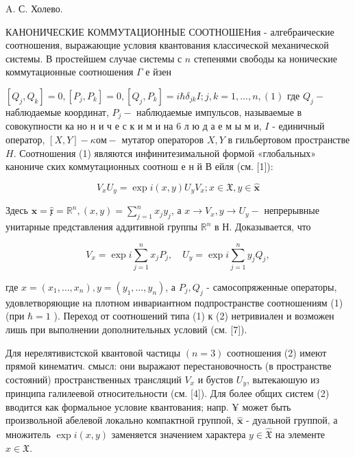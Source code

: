 \documentclass[10pt]{article}
\begin{document}
A. С. Холево.



КАНОНИЧЕСКИЕ КОММУТАЦИОННЫЕ СООТНОШЕНия - алгебраические соотношения, выражающие условия квантования классической механической системы. В простейшем случае системы с $n$ степенями свободы ка нонические коммутационные соотношения $\Gamma$ е йзен



$\left[Q_{j}, Q_{k}\right]=0,\left[P_{j}, P_{k}\right]=0,\left[Q_{j}, P_{k}\right]=i \hbar \delta_{j k} I ; j, k=1, \ldots, n,(1)$ где $Q_{j}-$ наблюдаемые координат, $P_{j}-$ наблюдаемые импульсов, называемые в совокупности ка но н и ч е с к и м и на 6 л ю д а е м ы м и, $I$ - единичный оператор, $[X, Y]-\kappa о м-$ мутатор операторов $X, Y$ в гильбертовом пространстве $H$. Соотношения (1) являются инфинитезимальной формой «глобальных» канониче ских коммутационных соотнош е н й В ейля (см. [1]):



\[

V_{x} U_{y}=\exp i(x, y) U_{y} V_{x} ; x \in \mathfrak{X}, y \in \hat{\boldsymbol{x}}

\]



Здесь $\boldsymbol{x}=\hat{\mathfrak{x}}=\mathbb{R}^{n},(x, y)=\sum_{j=1}^{n} x_{j} y_{j}$, а $x \rightarrow V_{x}, y \rightarrow U_{y}-$ непрерывные унитарные представления аддитивной группы $\mathbb{R}^{n}$ в $Н$. Доказывается, что



\[

V_{x}=\exp i \sum_{j=1}^{n} x_{j} P_{j}, \quad U_{y}=\exp i \sum_{j=1}^{n} y_{j} Q_{j},

\]



где $x=\left(x_{1}, \ldots, x_{n}\right), y=\left(y_{1}, \ldots, y_{n}\right)$, а $P_{j}, Q_{j}$ - самосопряженные операторы, удовлетворяющие на плотном инвариантном подпространстве соотношениям (1) (при $\hbar=1$ ). Переход от соотношений типа (1) к (2) нетривиален и возможен лишь при выполнении дополнительных условий (см. [7]).



Для нерелятивистской квантовой частицы $(n=3)$ соотношения (2) имеют прямой кинематич. смысл: они выражают перестановочность (в пространстве состояний) пространственных трансляций $V_{x}$ и бустов $U_{y}$, вытекаюшую из принципа галилеевой относительности (см. [4]). Для более общих систем (2) вводится как формальное условие квантования; напр. ¥ может быть произвольной абелевой локально компактной группой, $\hat{\boldsymbol{x}}$ - дуальной группой, а множитель $\exp i(x, y)$ заменяется значением характера $y \in \hat{\mathfrak{X}}$ на элементе $x \in \mathfrak{X}$.
\end{document}
